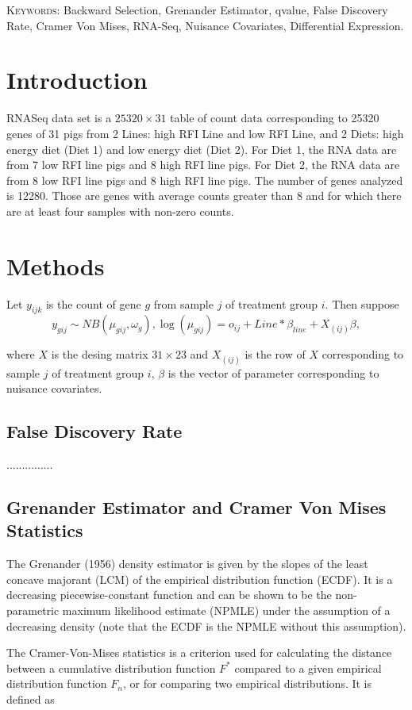 \documentclass[12pt, letter]{article}\usepackage[]{graphicx}\usepackage[]{color}
\begin{document}
\noindent\textsc{Keywords}: {Backward Selection, Grenander Estimator, qvalue, False Discovery Rate, Cramer Von Mises, RNA-Seq, Nuisance Covariates, Differential Expression.}


\section{\bf Introduction}
RNASeq data set is a $25320 \times 31$ table of count data corresponding
to 25320 genes of 31 pigs from 2 Lines: high RFI Line and low RFI
Line, and 2 Diets: high energy diet (Diet 1) and low energy diet (Diet
2). For Diet 1, the RNA data are from 7 low RFI line pigs and 8 high RFI
line pigs. For Diet 2, the RNA data are from 8 low RFI line pigs and 8
high RFI line pigs.
The number of genes analyzed is
12280. Those are genes with average counts greater than 8 and for
which there are at least four samples with non-zero counts.

\section{\bf Methods}
Let $y_{ijk}$ is the count of gene $g$ from sample $j$ of treatment group $i$. Then suppose 
\[
y_{gij} \sim NB(\mu_{gij}, \omega_g), \log(\mu_{gij}) = o_{ij} + Line*\beta_{line} + X_{(ij)}\beta,
\]

where $X$ is the desing matrix $31\times 23$ and $X_{(ij)}$ is the row of $X$ 
corresponding to sample $j$ of treatment group $i$, $\beta$ is the vector of parameter corresponding to  nuisance covariates.
\subsection{\bf False Discovery Rate}
...............
\subsection{\bf Grenander Estimator and Cramer Von Mises Statistics}
The Grenander (1956) density estimator is given by the slopes of the least concave majorant (LCM) of the empirical distribution function (ECDF). It is a decreasing piecewise-constant function and can be shown to be the non-parametric maximum likelihood estimate (NPMLE) under the assumption of a decreasing density (note that the ECDF is the NPMLE without this assumption). 

The Cramer-Von-Mises statistics is a criterion used for calculating the distance between  a cumulative distribution function $F^*$ compared to a given empirical distribution function $F_n$, or for comparing two empirical distributions. It is defined as
\end{document}
